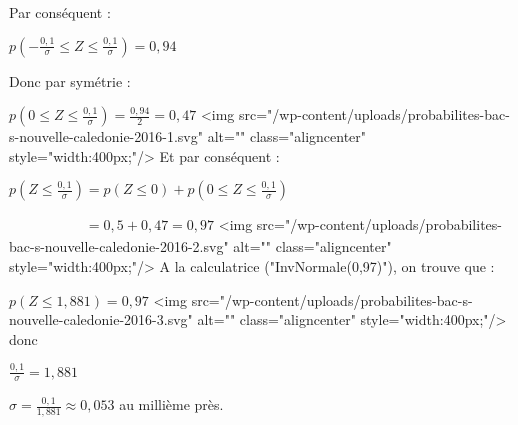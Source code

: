 \begin{corrige}
\begin{enumerate}
\begin{enumerate}
               Par conséquent :
               \par
               $p\left(-\frac{0,1}{\sigma} \leqslant Z \leqslant \frac{0,1}{\sigma}\right) =0,94$
               \par
               Donc par symétrie :
               \par
               $p\left(0 \leqslant Z \leqslant \frac{0,1}{\sigma}\right) =\frac{0,94}{2}=0,47$
               <img src="/wp-content/uploads/probabilites-bac-s-nouvelle-caledonie-2016-1.svg" alt="" class="aligncenter" style="width:400px;"/>
               Et par conséquent :
               \par
               $p\left(Z \leqslant \frac{0,1}{\sigma}\right) =p\left(Z \leqslant 0 \right) +p\left(0 \leqslant Z \leqslant \frac{0,1}{\sigma}\right)  $
               \par
               $\phantom{p\left(Z \leqslant \frac{0,1}{\sigma}\right)} =0,5 + 0,47=0,97 $
               <img src="/wp-content/uploads/probabilites-bac-s-nouvelle-caledonie-2016-2.svg" alt="" class="aligncenter" style="width:400px;"/>
               A la calculatrice ("InvNormale(0,97)"), on trouve que :
               \par
               $p\left(Z \leqslant 1,881\right)=0,97 $
               <img src="/wp-content/uploads/probabilites-bac-s-nouvelle-caledonie-2016-3.svg" alt="" class="aligncenter" style="width:400px;"/>
               donc
               \par
               $\frac{0,1}{\sigma}=1,881$
               \par
               $\sigma=\frac{0,1}{1,881} \approx 0,053$ au millième près.
          \end{enumerate}
     \end{enumerate}
\end{corrige}
